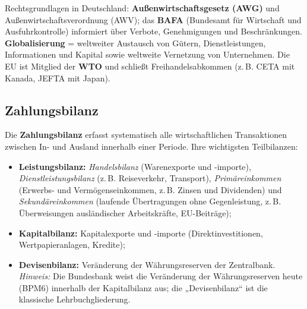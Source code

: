 \documentclass[11pt, a4paper]{article}
\begin{document}
\begin{merksatz}
Rechtsgrundlagen in Deutschland: \textbf{Außenwirtschaftsgesetz (AWG)} und
Außenwirtschaftsverordnung (AWV); das \textbf{BAFA} (Bundesamt für Wirtschaft und
Ausfuhrkontrolle) informiert über Verbote, Genehmigungen und Beschränkungen.
\textbf{Globalisierung} = weltweiter Austausch von Gütern, Dienstleistungen, Informationen
und Kapital sowie weltweite Vernetzung von Unternehmen. Die EU ist Mitglied der
\textbf{WTO} und schließt Freihandelsabkommen (z.\,B. CETA mit Kanada, JEFTA mit Japan).
\end{merksatz}

\subsection{Zahlungsbilanz}

Die \textbf{Zahlungsbilanz} erfasst systematisch alle wirtschaftlichen Transaktionen
zwischen In- und Ausland innerhalb einer Periode. Ihre wichtigsten Teilbilanzen:

\begin{itemize}
  \item \textbf{Leistungsbilanz:} \emph{Handelsbilanz} (Warenexporte und -importe),
    \emph{Dienstleistungsbilanz} (z.\,B. Reiseverkehr, Transport),
    \emph{Primäreinkommen} (Erwerbs- und Vermögenseinkommen, z.\,B. Zinsen und
    Dividenden) und \emph{Sekundäreinkommen} (laufende Übertragungen ohne Gegenleistung,
    z.\,B. Überweisungen ausländischer Arbeitskräfte, EU-Beiträge);
  \item \textbf{Kapitalbilanz:} Kapitalexporte und -importe (Direktinvestitionen,
    Wertpapieranlagen, Kredite);
  \item \textbf{Devisenbilanz:} Veränderung der Währungsreserven der Zentralbank.
    \emph{Hinweis:} Die Bundesbank weist die Veränderung der Währungsreserven heute
    (BPM6) innerhalb der Kapitalbilanz aus; die „Devisenbilanz`` ist die klassische
    Lehrbuchgliederung.
\end{itemize}
\end{document}
